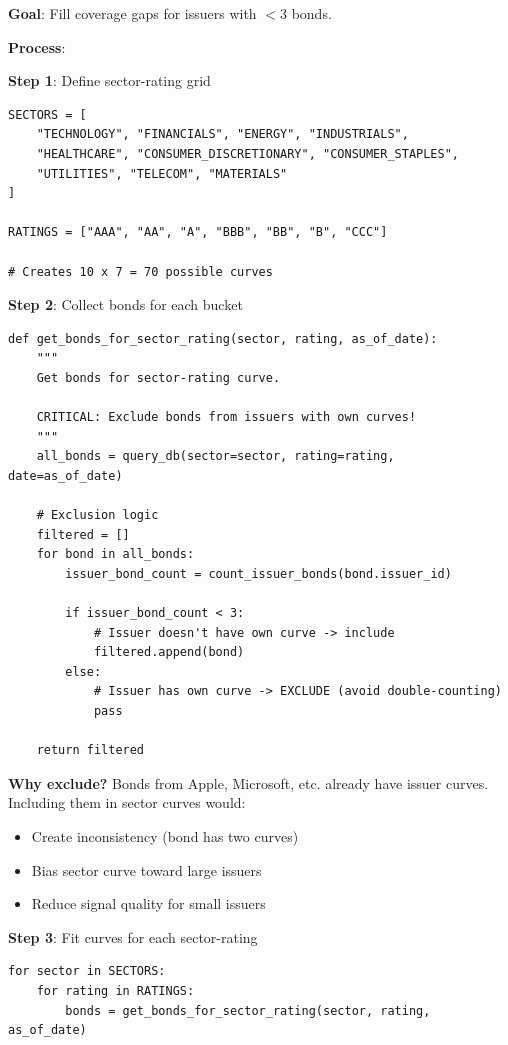 \documentclass[11pt,a4paper]{article}
\begin{document}
\begin{implbox}
\textbf{Goal}: Fill coverage gaps for issuers with $<3$ bonds.

\textbf{Process}:

\textbf{Step 1}: Define sector-rating grid
\begin{lstlisting}
SECTORS = [
    "TECHNOLOGY", "FINANCIALS", "ENERGY", "INDUSTRIALS",
    "HEALTHCARE", "CONSUMER_DISCRETIONARY", "CONSUMER_STAPLES",
    "UTILITIES", "TELECOM", "MATERIALS"
]

RATINGS = ["AAA", "AA", "A", "BBB", "BB", "B", "CCC"]

# Creates 10 x 7 = 70 possible curves
\end{lstlisting}

\textbf{Step 2}: Collect bonds for each bucket

\begin{lstlisting}
def get_bonds_for_sector_rating(sector, rating, as_of_date):
    """
    Get bonds for sector-rating curve.
    
    CRITICAL: Exclude bonds from issuers with own curves!
    """
    all_bonds = query_db(sector=sector, rating=rating, date=as_of_date)
    
    # Exclusion logic
    filtered = []
    for bond in all_bonds:
        issuer_bond_count = count_issuer_bonds(bond.issuer_id)
        
        if issuer_bond_count < 3:
            # Issuer doesn't have own curve -> include
            filtered.append(bond)
        else:
            # Issuer has own curve -> EXCLUDE (avoid double-counting)
            pass
    
    return filtered
\end{lstlisting}

\textbf{Why exclude?} Bonds from Apple, Microsoft, etc. already have issuer curves. Including them in sector curves would:
\begin{itemize}
    \item Create inconsistency (bond has two curves)
    \item Bias sector curve toward large issuers
    \item Reduce signal quality for small issuers
\end{itemize}

\textbf{Step 3}: Fit curves for each sector-rating

\begin{lstlisting}
for sector in SECTORS:
    for rating in RATINGS:
        bonds = get_bonds_for_sector_rating(sector, rating, as_of_date)
        

\end{lstlisting}
\end{implbox}
\end{document}
